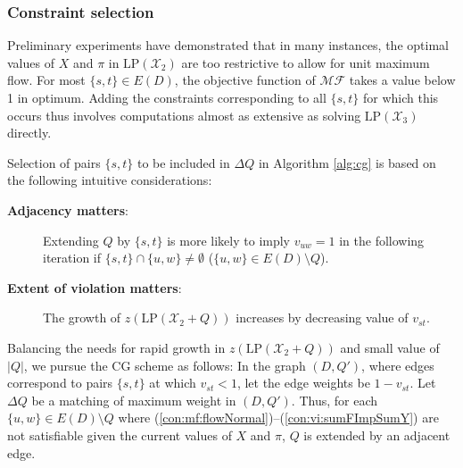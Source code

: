 \subsubsection{Constraint selection}

Preliminary experiments have demonstrated that in many instances, the optimal values of $X$ and $\pi$ in $\text{LP}(\mathcal{X}_2)$ are too restrictive to allow for unit maximum flow.
For most $\{s,t\}\in E(D)$, the objective function of $\mathcal{MF}$ takes a value below 1 in optimum.
Adding the constraints corresponding to all $\{s,t\}$ for which this occurs thus involves computations almost as extensive as solving $\text{LP}(\mathcal{X}_3)$ directly.

Selection of pairs $\{s,t\}$ to be included in $\Delta Q$ in Algorithm \ref{alg:cg} is based on the following intuitive considerations:
\begin{description}
  \item[\textbf{Adjacency matters}:] Extending $Q$ by $\{s,t\}$ is more likely to imply $v_{uw}=1$ in the following iteration if $\{s,t\}\cap\{u,w\}\neq\emptyset$ ($\{u,w\}\in E(D)\setminus Q$).
  \item[\textbf{Extent of violation matters}:] The growth of $z\left(\text{LP}(\mathcal{X}_2+Q)\right)$ increases by decreasing value of $v_{st}$.
\end{description}

Balancing the needs for rapid growth in $z\left(\text{LP}(\mathcal{X}_2+Q)\right)$ and small value of $|Q|$,
we pursue the CG scheme as follows:
In the graph $(D,Q')$, where edges correspond to pairs $\{s,t\}$ at which $v_{st}<1$, let the edge weights be $1-v_{st}$.
Let $\Delta Q$ be a matching of maximum weight in $(D,Q')$.
Thus, for each $\{u,w\}\in E(D)\setminus Q$ where (\ref{con:mf:flowNormal})--(\ref{con:vi:sumFImpSumY}) are not satisfiable given the current values of $X$ and $\pi$,
$Q$ is extended by an adjacent edge.

